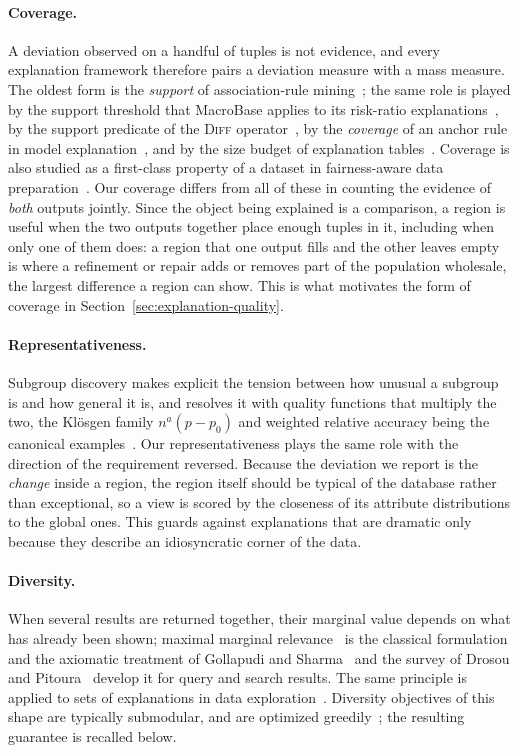 \paragraph{Coverage.}
A deviation observed on a handful of tuples is not evidence, and every explanation
framework therefore pairs a deviation measure with a mass measure.
The oldest form is the \emph{support} of association-rule
mining~\cite{AgrawalIS93}; the same role is played by the support threshold that
MacroBase applies to its risk-ratio explanations~\cite{MacroBase}, by the support
predicate of the \textsc{Diff} operator~\cite{DIFF}, by the \emph{coverage} of an
anchor rule in model explanation~\cite{Anchors}, and by the size budget of
explanation tables~\cite{ExplanationTables}.
Coverage is also studied as a first-class property of a dataset in fairness-aware
data preparation~\cite{AsudehJJ19}.
Our coverage differs from all of these in counting the evidence of \emph{both}
outputs jointly.
Since the object being explained is a comparison, a region is useful when the two
outputs together place enough tuples in it, including when only one of them does:
a region that one output fills and the other leaves empty is where a refinement or
repair adds or removes part of the population wholesale, the largest difference a
region can show.
This is what motivates the form of coverage in Section~\ref{sec:explanation-quality}.

\paragraph{Representativeness.}
Subgroup discovery makes explicit the tension between how unusual a subgroup is and
how general it is, and resolves it with quality functions that multiply the two,
the Klösgen family $n^{a}(p-p_0)$ and weighted relative accuracy being the canonical
examples~\cite{Wrobel97,HerreraCGJ11}.
Our representativeness plays the same role with the direction of the requirement
reversed.
Because the deviation we report is the \emph{change} inside a region, the
region itself should be typical of the database rather than exceptional, so a view
is scored by the closeness of its attribute distributions to the global ones.
This guards against explanations that are dramatic only because they describe an
idiosyncratic corner of the data.

\paragraph{Diversity.}
When several results are returned together, their marginal value depends on what has
already been shown; maximal marginal relevance~\cite{MMR} is the classical
formulation and the axiomatic treatment of Gollapudi and Sharma~\cite{GollapudiS09}
and the survey of Drosou and Pitoura~\cite{DrosouP10} develop it for query and
search results.
The same principle is applied to sets of explanations in data
exploration~\cite{FEDEX,ICDE23}.
Diversity objectives of this shape are typically submodular, and are optimized
greedily~\cite{LinBilmes11}; the resulting guarantee is recalled below.

